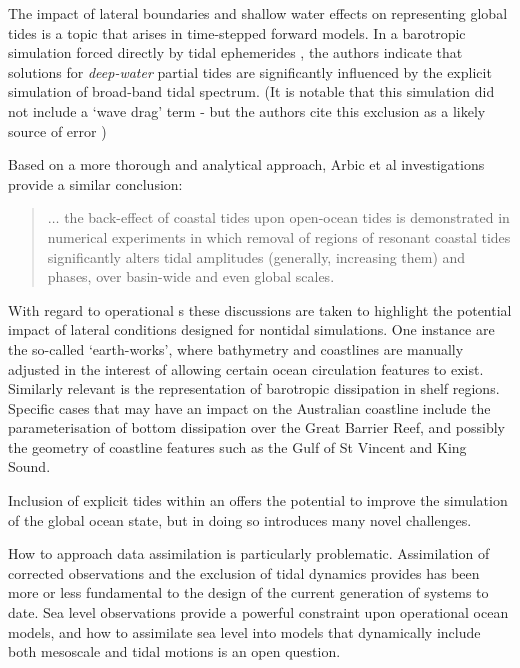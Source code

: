 The impact of lateral boundaries and shallow water effects on representing global tides is a topic that arises in time-stepped forward models.
In a barotropic simulation forced directly by tidal ephemerides \cite{Weis:2008ex}, the authors indicate that solutions for \emph{deep-water} partial tides are significantly influenced by the explicit simulation of broad-band tidal spectrum.   
(It is notable that this simulation did not include a `wave drag' term - but the authors cite this exclusion as a likely source of error \citep[pp5]{Weis:2008ex})

Based on a more thorough and analytical approach, Arbic et al investigations provide a similar conclusion:
\noindent \begin{quotation}
$\dots{}$ the back-effect of coastal tides upon open-ocean tides is demonstrated in numerical experiments in which removal of regions of resonant coastal tides significantly alters tidal amplitudes (generally, increasing them) and phases, over basin-wide and even global scales.\citep[pp263]{Arbic:2009in}
\end{quotation}

With regard to operational \OGCM{}s these discussions are taken to highlight the potential impact of lateral conditions designed for nontidal simulations.  
One instance are the so-called `earth-works', where bathymetry and coastlines are manually adjusted in the interest of allowing certain ocean circulation features to exist.  
Similarly relevant is the representation of barotropic dissipation in shelf regions. 
Specific cases that may have an impact on the Australian coastline include the parameterisation of bottom dissipation over the Great Barrier Reef, and possibly the geometry of coastline features such as the Gulf of St Vincent and King Sound.


Inclusion of explicit tides within an \OGCM{}  offers the potential to improve the simulation of the global ocean state, but in doing so introduces many novel challenges.

How to approach data assimilation is particularly problematic.  Assimilation of corrected observations and the exclusion of tidal dynamics provides has been more or less fundamental to the design of the current generation of \GODAE{} systems to date.
Sea level observations provide a powerful constraint upon operational ocean models, and how to assimilate sea level into models that dynamically include both mesoscale and tidal motions is an open question.   
